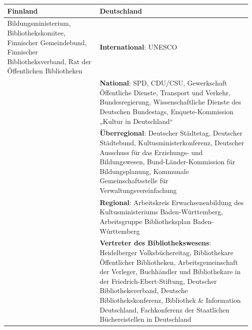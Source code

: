 \documentclass[a4paper,
fontsize=11pt,
oneside,
numbers=noperiodatend,
parskip=half-,
bibliography=totoc,
final
]{scrartcl}
\begin{document}
\begin{longtable}[]{@{}ll@{}}
\toprule
\begin{minipage}[b]{0.43\columnwidth}\raggedright
Finnland\strut
\end{minipage} & \begin{minipage}[b]{0.43\columnwidth}\raggedright
Deutschland\strut
\end{minipage}\tabularnewline
\midrule
\endhead
\begin{minipage}[t]{0.43\columnwidth}\raggedright
Bildungsministerium, Bibliothekskomitee, Finnischer Gemeindebund,
Finnischer Bibliotheksverband, Rat der Öffentlichen Bibliotheken\strut
\end{minipage} & \begin{minipage}[t]{0.43\columnwidth}\raggedright
\textbf{International}: UNESCO\strut
\end{minipage}\tabularnewline
\begin{minipage}[t]{0.43\columnwidth}\raggedright
\strut
\end{minipage} & \begin{minipage}[t]{0.43\columnwidth}\raggedright
\textbf{National}: SPD, CDU/CSU, Gewerkschaft Öffentliche Dienste,
Transport und Verkehr, Bundesregierung, Wissenschaftliche Dienste des
Deutschen Bundestags, Enquete-Kommission „Kultur in Deutschland``\strut
\end{minipage}\tabularnewline
\begin{minipage}[t]{0.43\columnwidth}\raggedright
\strut
\end{minipage} & \begin{minipage}[t]{0.43\columnwidth}\raggedright
\textbf{Überregional}: Deutscher Städtetag, Deutscher Städtebund,
Kultusministerkonferenz, Deutscher Ausschuss für das Erziehungs- und
Bildungswesen, Bund-Länder-Kommission für Bildungsplanung, Kommunale
Gemeinschaftsstelle für Verwaltungsvereinfachung\strut
\end{minipage}\tabularnewline
\begin{minipage}[t]{0.43\columnwidth}\raggedright
\strut
\end{minipage} & \begin{minipage}[t]{0.43\columnwidth}\raggedright
\textbf{Regional}: Arbeitskreis Erwachsenenbildung des
Kultusministeriums Baden-Württemberg, Arbeitsgruppe Bibliotheksplan
Baden-Württemberg\strut
\end{minipage}\tabularnewline
\begin{minipage}[t]{0.43\columnwidth}\raggedright
\strut
\end{minipage} & \begin{minipage}[t]{0.43\columnwidth}\raggedright
\textbf{Vertreter des Bibliothekswesens}: Heidelberger Volksbüchereitag,
Bibliothekare Öffentlicher Bibliotheken, Arbeitsgemeinschaft der
Verleger, Buchhändler und Bibliothekare in der Friedrich-Ebert-Stiftung,
Deutscher Bibliotheksverband, Deutsche Bibliothekskonferenz, Bibliothek
\& Information Deutschland, Fachkonferenz der Staatlichen
Büchereistellen in Deutschland\strut
\end{minipage}\tabularnewline
\bottomrule
\end{longtable}
\end{document}
